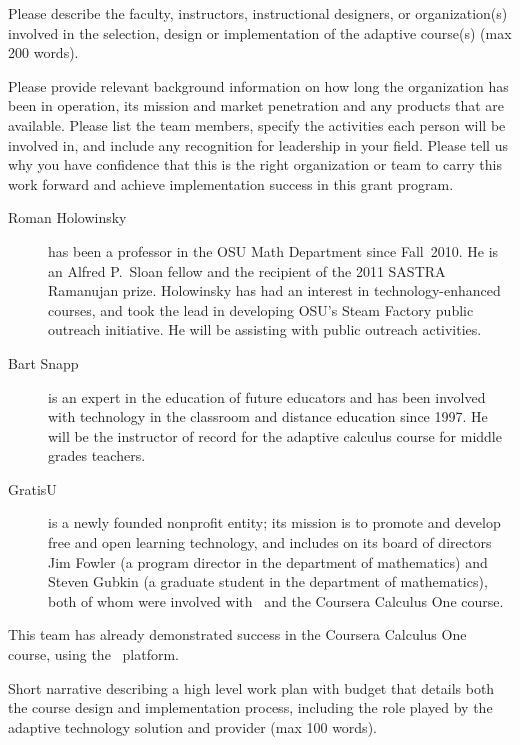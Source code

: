 \begin{question}
  Please describe the faculty, instructors, instructional designers,
  or organization(s) involved in the selection, design or
  implementation of the adaptive course(s) (max 200 words).

  Please provide relevant background information on how long the
  organization has been in operation, its mission and market
  penetration and any products that are available. Please list the
  team members, specify the activities each person will be involved
  in, and include any recognition for leadership in your field. Please
  tell us why you have confidence that this is the right organization
  or team to carry this work forward and achieve implementation
  success in this grant program.
\end{question}

\begin{description}
\item[Roman Holowinsky] has been a professor in the OSU Math
  Department since Fall~2010. He is an Alfred P.~Sloan fellow and the
  recipient of the 2011 SASTRA Ramanujan prize.  Holowinsky has had an
  interest in technology-enhanced courses, and took the lead in
  developing OSU's Steam Factory public outreach initiative.  He will
  be assisting with public outreach activities.
\item[Bart Snapp] is an expert in the education of future educators
  and has been involved with technology in the classroom and distance
  education since 1997.  He will be the instructor of record for the
  adaptive calculus course for middle grades teachers.
\item[GratisU] is a newly founded nonprofit entity; its mission is to
  promote and develop free and open learning technology, and includes
  on its board of directors Jim Fowler (a program director in the
  department of mathematics) and Steven Gubkin (a graduate student in
  the department of mathematics), both of whom were involved with
  \mooculus\ and the Coursera Calculus One course.
\end{description}
This team has already demonstrated success in the Coursera Calculus
One course, using the \mooculus\ platform.

\begin{question}
Short narrative describing a high level work plan with budget
that details both the course design and implementation process,
including the role played by the adaptive technology solution and
provider (max 100 words).
\end{question}

